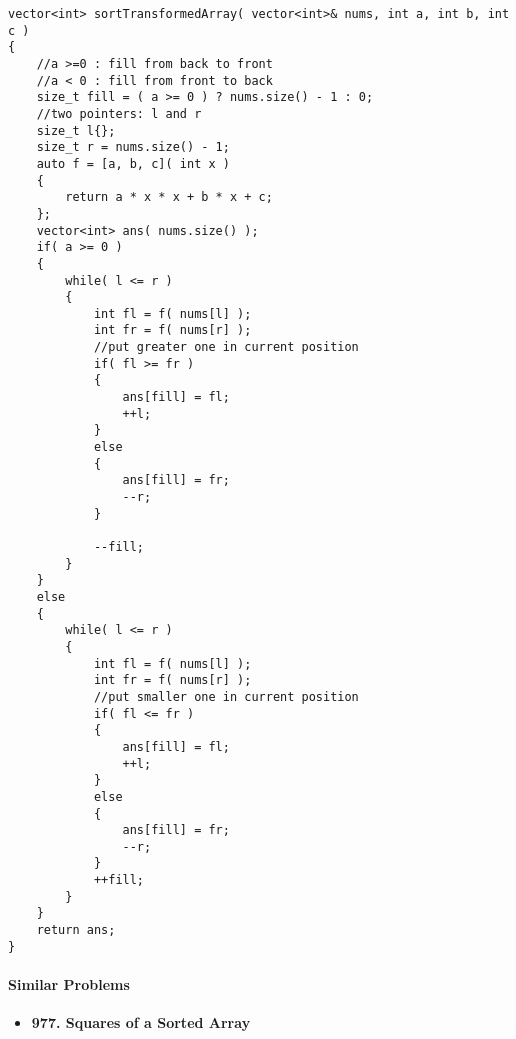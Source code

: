 \setcounter{lstlisting}{0}
\begin{lstlisting}[style=customc, caption={Two Pointers}]
vector<int> sortTransformedArray( vector<int>& nums, int a, int b, int c )
{
    //a >=0 : fill from back to front
    //a < 0 : fill from front to back
    size_t fill = ( a >= 0 ) ? nums.size() - 1 : 0;
    //two pointers: l and r
    size_t l{};
    size_t r = nums.size() - 1;
    auto f = [a, b, c]( int x )
    {
        return a * x * x + b * x + c;
    };
    vector<int> ans( nums.size() );
    if( a >= 0 )
    {
        while( l <= r )
        {
            int fl = f( nums[l] );
            int fr = f( nums[r] );
            //put greater one in current position
            if( fl >= fr )
            {
                ans[fill] = fl;
                ++l;
            }
            else
            {
                ans[fill] = fr;
                --r;
            }

            --fill;
        }
    }
    else
    {
        while( l <= r )
        {
            int fl = f( nums[l] );
            int fr = f( nums[r] );
            //put smaller one in current position
            if( fl <= fr )
            {
                ans[fill] = fl;
                ++l;
            }
            else
            {
                ans[fill] = fr;
                --r;
            }
            ++fill;
        }
    }
    return ans;
}
\end{lstlisting}

\paragraph{Similar Problems}
\begin{itemize}
\item \textbf{977. Squares of a Sorted Array}
\end{itemize}